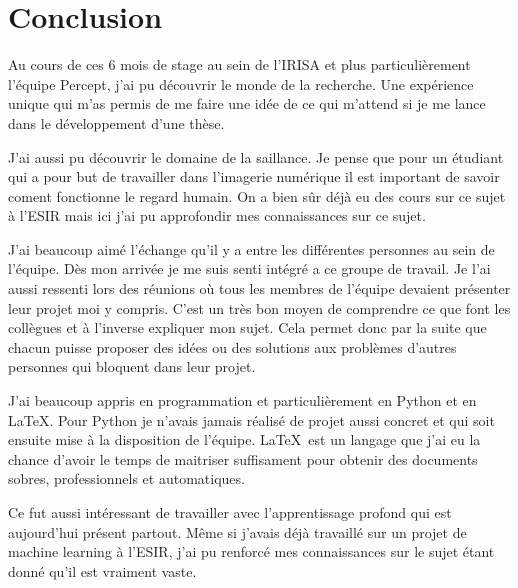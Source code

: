 \chapter{Conclusion}

Au cours de ces 6 mois de stage au sein de l'IRISA et plus particulièrement l'équipe Percept, j'ai pu découvrir le monde de la recherche. Une expérience unique qui m'as permis de me faire une idée de ce qui m'attend si je me lance dans le développement d'une thèse.

J'ai aussi pu découvrir le domaine de la saillance. Je pense que pour un étudiant qui a pour but de travailler dans l'imagerie numérique il est important de savoir coment fonctionne le regard humain. On a bien sûr déjà eu des cours sur ce sujet à l'ESIR mais ici j'ai pu approfondir mes connaissances sur ce sujet.

J'ai beaucoup aimé l'échange qu'il y a entre les différentes personnes au sein de l'équipe. Dès mon arrivée je me suis senti intégré a ce groupe de travail. Je l'ai aussi ressenti lors des réunions où tous les membres de l'équipe devaient présenter leur projet moi y compris. C'est un très bon moyen de comprendre ce que font les collègues et à l'inverse expliquer mon sujet. Cela permet donc par la suite que chacun puisse proposer des idées ou des solutions aux problèmes d'autres personnes qui bloquent dans leur projet.

J'ai beaucoup appris en programmation et particulièrement en Python et en \LaTeX. Pour Python je n'avais jamais réalisé de projet aussi concret et qui soit ensuite mise à la disposition de l'équipe. \LaTeX\ est un langage que j'ai eu la chance d'avoir le temps de maitriser suffisament pour obtenir des documents sobres, professionnels et automatiques.

Ce fut aussi intéressant de travailler avec l'apprentissage profond qui est aujourd'hui présent partout. Même si j'avais déjà travaillé sur un projet de machine learning à l'ESIR, j'ai pu renforcé mes connaissances sur le sujet étant donné qu'il est vraiment vaste.